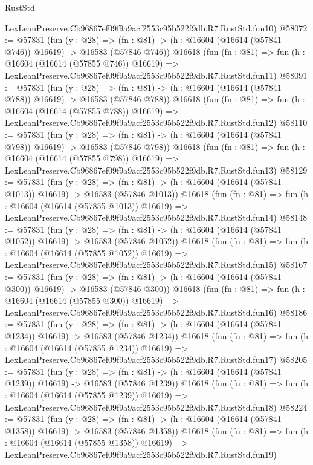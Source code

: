 \begin{lexlean}{RustStd}
\begin{coremodule}
    LexLeanPreserve.Cb96867ef09f9a9acf2553c95b522f9db.R7.RustStd.fun10)
@58072 := @57831
    (fun (y : @28) =>
    (fn : @81) -> (h : @16604 (@16614 (@57841 @746)) @16619) -> @16583 (@57846 @746))
    @16618
    (fun (fn : @81) =>
    fun (h : @16604 (@16614 (@57855 @746)) @16619) =>
    LexLeanPreserve.Cb96867ef09f9a9acf2553c95b522f9db.R7.RustStd.fun11)
@58091 := @57831
    (fun (y : @28) =>
    (fn : @81) -> (h : @16604 (@16614 (@57841 @788)) @16619) -> @16583 (@57846 @788))
    @16618
    (fun (fn : @81) =>
    fun (h : @16604 (@16614 (@57855 @788)) @16619) =>
    LexLeanPreserve.Cb96867ef09f9a9acf2553c95b522f9db.R7.RustStd.fun12)
@58110 := @57831
    (fun (y : @28) =>
    (fn : @81) -> (h : @16604 (@16614 (@57841 @798)) @16619) -> @16583 (@57846 @798))
    @16618
    (fun (fn : @81) =>
    fun (h : @16604 (@16614 (@57855 @798)) @16619) =>
    LexLeanPreserve.Cb96867ef09f9a9acf2553c95b522f9db.R7.RustStd.fun13)
@58129 := @57831
    (fun (y : @28) =>
    (fn : @81) -> (h : @16604 (@16614 (@57841 @1013)) @16619) -> @16583 (@57846 @1013))
    @16618
    (fun (fn : @81) =>
    fun (h : @16604 (@16614 (@57855 @1013)) @16619) =>
    LexLeanPreserve.Cb96867ef09f9a9acf2553c95b522f9db.R7.RustStd.fun14)
@58148 := @57831
    (fun (y : @28) =>
    (fn : @81) -> (h : @16604 (@16614 (@57841 @1052)) @16619) -> @16583 (@57846 @1052))
    @16618
    (fun (fn : @81) =>
    fun (h : @16604 (@16614 (@57855 @1052)) @16619) =>
    LexLeanPreserve.Cb96867ef09f9a9acf2553c95b522f9db.R7.RustStd.fun15)
@58167 := @57831
    (fun (y : @28) =>
    (fn : @81) -> (h : @16604 (@16614 (@57841 @300)) @16619) -> @16583 (@57846 @300))
    @16618
    (fun (fn : @81) =>
    fun (h : @16604 (@16614 (@57855 @300)) @16619) =>
    LexLeanPreserve.Cb96867ef09f9a9acf2553c95b522f9db.R7.RustStd.fun16)
@58186 := @57831
    (fun (y : @28) =>
    (fn : @81) -> (h : @16604 (@16614 (@57841 @1234)) @16619) -> @16583 (@57846 @1234))
    @16618
    (fun (fn : @81) =>
    fun (h : @16604 (@16614 (@57855 @1234)) @16619) =>
    LexLeanPreserve.Cb96867ef09f9a9acf2553c95b522f9db.R7.RustStd.fun17)
@58205 := @57831
    (fun (y : @28) =>
    (fn : @81) -> (h : @16604 (@16614 (@57841 @1239)) @16619) -> @16583 (@57846 @1239))
    @16618
    (fun (fn : @81) =>
    fun (h : @16604 (@16614 (@57855 @1239)) @16619) =>
    LexLeanPreserve.Cb96867ef09f9a9acf2553c95b522f9db.R7.RustStd.fun18)
@58224 := @57831
    (fun (y : @28) =>
    (fn : @81) -> (h : @16604 (@16614 (@57841 @1358)) @16619) -> @16583 (@57846 @1358))
    @16618
    (fun (fn : @81) =>
    fun (h : @16604 (@16614 (@57855 @1358)) @16619) =>
    LexLeanPreserve.Cb96867ef09f9a9acf2553c95b522f9db.R7.RustStd.fun19)

\end{coremodule}
\end{lexlean}
